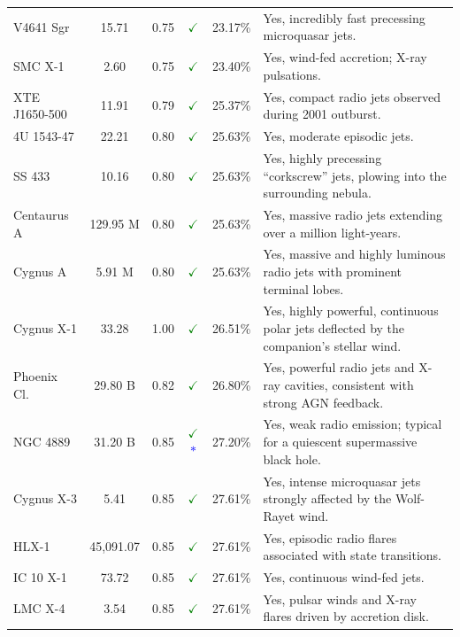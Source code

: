 \documentclass[11pt, a4paper]{article}
\begin{document}
\begin{landscape}
\begin{longtable}[l]{@{} l c c c c p{14cm} @{}}
  V4641 Sgr & 15.71 & 0.75 & \textcolor{green}{\Large $\checkmark$} & 23.17\% & Yes, incredibly fast precessing microquasar jets. \\
  SMC X-1 & 2.60 & 0.75 & \textcolor{green}{\Large $\checkmark$} & 23.40\% & Yes, wind-fed accretion; X-ray pulsations. \\
  XTE J1650-500 & 11.91 & 0.79 & \textcolor{green}{\Large $\checkmark$} & 25.37\% & Yes, compact radio jets observed during 2001 outburst. \\
  4U 1543-47 & 22.21 & 0.80 & \textcolor{green}{\Large $\checkmark$} & 25.63\% & Yes, moderate episodic jets. \\
  SS 433 & 10.16 & 0.80 & \textcolor{green}{\Large $\checkmark$} & 25.63\% & Yes, highly precessing ``corkscrew'' jets, plowing into the surrounding nebula. \\
  Centaurus A & 129.95 M & 0.80 & \textcolor{green}{\Large $\checkmark$} & 25.63\% & Yes, massive radio jets extending over a million light-years. \\
  Cygnus A & 5.91 M & 0.80 & \textcolor{green}{\Large $\checkmark$} & 25.63\% & Yes, massive and highly luminous radio jets with prominent terminal lobes. \\
  Cygnus X-1 & 33.28 & 1.00 & \textcolor{green}{\Large $\checkmark$} & 26.51\% & Yes, highly powerful, continuous polar jets deflected by the companion's stellar wind. \\
  Phoenix Cl. & 29.80 B & 0.82 & \textcolor{green}{\Large $\checkmark$} & 26.80\% & Yes, powerful radio jets and X-ray cavities, consistent with strong AGN feedback. \\
  NGC 4889 & 31.20 B & 0.85 & \textcolor{green}{\Large $\checkmark$} \textcolor{blue}{\Large $*$} & 27.20\% & Yes, weak radio emission; typical for a quiescent supermassive black hole. \\
  Cygnus X-3 & 5.41 & 0.85 & \textcolor{green}{\Large $\checkmark$} & 27.61\% & Yes, intense microquasar jets strongly affected by the Wolf-Rayet wind. \\
  HLX-1 & 45,091.07 & 0.85 & \textcolor{green}{\Large $\checkmark$} & 27.61\% & Yes, episodic radio flares associated with state transitions. \\
  IC 10 X-1 & 73.72 & 0.85 & \textcolor{green}{\Large $\checkmark$} & 27.61\% & Yes, continuous wind-fed jets. \\
  LMC X-4 & 3.54 & 0.85 & \textcolor{green}{\Large $\checkmark$} & 27.61\% & Yes, pulsar winds and X-ray flares driven by accretion disk. \\

\end{longtable}
\end{landscape}
\end{document}
